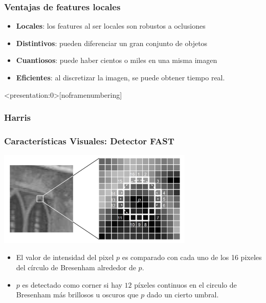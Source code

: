 \begin{frame}
    \frametitle{Ventajas de features locales}
    \footnotesize

    \begin{itemize}
    \item \textbf{Locales}: los features al ser locales son robustos a oclusiones
    \item \textbf{Distintivos}: pueden diferenciar un gran conjunto de objetos
    \item \textbf{Cuantiosos}: puede haber cientos o miles en una misma imagen
    \item \textbf{Eficientes}: al discretizar la imagen, se puede obtener tiempo real.
\end{itemize}
    
\end{frame}

\begin{frame}<presentation:0>[noframenumbering]
    \frametitle{Harris}
    \footnotesize
    
    
\end{frame}

\begin{frame}
    \frametitle{Características Visuales: Detector FAST}
    
    \begin{center}
        \includegraphics[width=0.7\textwidth]{./images/camera/fast}
    \end{center}
    
    \begin{itemize}
        \item El valor de intensidad del pixel $p$ es comparado con cada uno de los 16 pixeles del círculo de Bresenham alrededor de $p$.
        \item $p$ es detectado como corner si hay $12$ píxeles continuos en el circulo de Bresenham más brillosos u oscuros que $p$ dado un cierto umbral.
    \end{itemize}

\end{frame}

